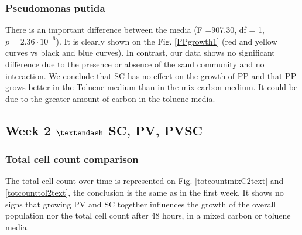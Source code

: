 \documentclass[a4paper, 10pt, conference]{ieeeconf}   %
\begin{document}
\subsubsection{Pseudomonas putida}
There is an important difference between the media (F =907.30, df = 1, $p = 2.36 \cdot 10^{-6}$). It is clearly shown on the Fig. \ref{PPgrowth1} (red and yellow curves vs black and blue curves).
In contrast, our data shows no significant difference due to the presence or absence of the sand community and no interaction.
We conclude that SC has no effect on the growth of PP and that PP grows better in the Toluene medium than in the mix carbon medium. It could be due to the greater amount of carbon in the toluene media.



%	
%	


\subsection{Week 2 $\textendash$ SC, PV, PVSC}

\subsubsection{Total cell count comparison}
The total cell count over time is represented on Fig. \ref{totcountmixC2text} and \ref{totcounttol2text}, the conclusion is the same as in the first week. It shows no signs that growing PV and SC together influences the growth of the overall population nor the total cell count after 48 hours, in a mixed carbon or toluene media.\newline
\end{document}
